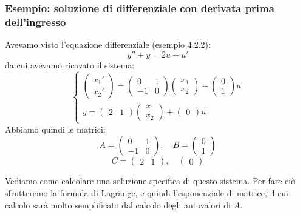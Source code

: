 \documentclass[a4paper,11pt]{article}
\begin{document}
\subsubsection{Esempio: soluzione di differenziale con derivata prima dell'ingresso}
Avevamo visto l'equazione differenziale (esempio 4.2.2):
$$
y'' + y = 2u + u'
$$
da cui avevamo ricavato il sistema:
\[
	\begin{cases}
		\begin{pmatrix}
			x_1' \\ x_2'
		\end{pmatrix}
		=
		\begin{pmatrix}
			0 & 1 \\ 
			-1 & 0
		\end{pmatrix}
		\begin{pmatrix}
			x_1 \\ x_2
		\end{pmatrix}
		+
		\begin{pmatrix}
		0 \\ 1
		\end{pmatrix}
		u \\ 

		y = 
		\begin{pmatrix}
			2 & 1
		\end{pmatrix}
		\begin{pmatrix}
			x_1 \\ x_2
		\end{pmatrix}
		+
		\begin{pmatrix}
			0
		\end{pmatrix}
		u
	\end{cases}
\]
Abbiamo quindi le matrici:
$$
	A = \begin{pmatrix}
			0 & 1 \\ 
			-1 & 0
		\end{pmatrix}, \quad 
	B = \begin{pmatrix}
		0 \\ 1
		\end{pmatrix}
$$
$$
	C = \begin{pmatrix}
			2 & 1
		\end{pmatrix}, \quad 		
		\begin{pmatrix}
			0
		\end{pmatrix} 
$$

Vediamo come calcolare una soluzione specifica di questo sistema.
Per fare ciò sfrutteremo la formula di Lagrange, e quindi l'esponenziale di matrice, il cui calcolo sarà molto semplificato dal calcolo degli autovalori di $A$.
\end{document}
